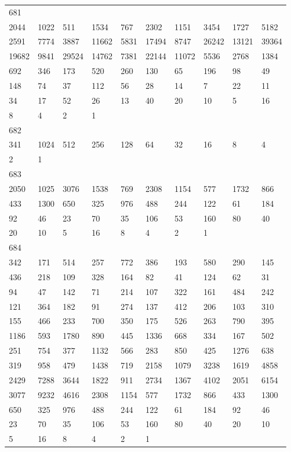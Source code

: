 \begin{longtable}{*{10}{l}}
681&&&&&&&&&\\
2044& 1022& 511& 1534& 767& 2302& 1151& 3454& 1727& 5182\\
2591& 7774& 3887& 11662& 5831& 17494& 8747& 26242& 13121& 39364\\
19682& 9841& 29524& 14762& 7381& 22144& 11072& 5536& 2768& 1384\\
692& 346& 173& 520& 260& 130& 65& 196& 98& 49\\
148& 74& 37& 112& 56& 28& 14& 7& 22& 11\\
34& 17& 52& 26& 13& 40& 20& 10& 5& 16\\
8& 4& 2& 1& \\

682&&&&&&&&&\\
341& 1024& 512& 256& 128& 64& 32& 16& 8& 4\\
2& 1& \\

683&&&&&&&&&\\
2050& 1025& 3076& 1538& 769& 2308& 1154& 577& 1732& 866\\
433& 1300& 650& 325& 976& 488& 244& 122& 61& 184\\
92& 46& 23& 70& 35& 106& 53& 160& 80& 40\\
20& 10& 5& 16& 8& 4& 2& 1& \\

684&&&&&&&&&\\
342& 171& 514& 257& 772& 386& 193& 580& 290& 145\\
436& 218& 109& 328& 164& 82& 41& 124& 62& 31\\
94& 47& 142& 71& 214& 107& 322& 161& 484& 242\\
121& 364& 182& 91& 274& 137& 412& 206& 103& 310\\
155& 466& 233& 700& 350& 175& 526& 263& 790& 395\\
1186& 593& 1780& 890& 445& 1336& 668& 334& 167& 502\\
251& 754& 377& 1132& 566& 283& 850& 425& 1276& 638\\
319& 958& 479& 1438& 719& 2158& 1079& 3238& 1619& 4858\\
2429& 7288& 3644& 1822& 911& 2734& 1367& 4102& 2051& 6154\\
3077& 9232& 4616& 2308& 1154& 577& 1732& 866& 433& 1300\\
650& 325& 976& 488& 244& 122& 61& 184& 92& 46\\
23& 70& 35& 106& 53& 160& 80& 40& 20& 10\\
5& 16& 8& 4& 2& 1& \\


\end{longtable}

